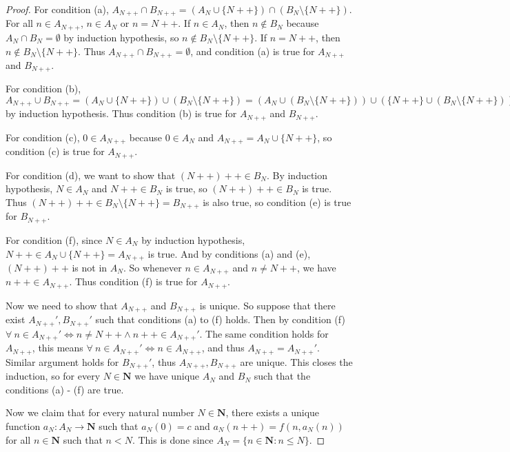 \begin{proof}
    For condition (a), \(A_{N++} \cap B_{N++} = (A_N \cup \{N++\}) \cap (B_N \setminus \{N++\})\).
    For all \(n \in A_{N++}\), \(n \in A_N\) or \(n = N++\).
    If \(n \in A_N\), then \(n \notin B_N\) because \(A_N \cap B_N = \emptyset\) by induction hypothesis, so \(n \notin B_N \setminus \{N++\}\).
    If \(n = N++\), then \(n \notin B_N \setminus \{N++\}\).
    Thus \(A_{N++} \cap B_{N++} = \emptyset\), and condition (a) is true for \(A_{N++}\) and \(B_{N++}\).

    For condition (b), \(A_{N++} \cup B_{N++} = (A_N \cup \{N++\}) \cup (B_N \setminus \{N++\}) = (A_N \cup (B_N \setminus \{N++\})) \cup (\{N++\} \cup (B_N \setminus \{N++\})) = (A_N \cup (B_N \setminus \{N++\})) \cup B_N = A_N \cup B_N = \mathbf{N}\) by induction hypothesis.
    Thus condition (b) is true for \(A_{N++}\) and \(B_{N++}\).

    For condition (c), \(0 \in A_{N++}\) because \(0 \in A_N\) and \(A_{N++} = A_N \cup \{N++\}\), so condition (c) is true for \(A_{N++}\).

    For condition (d), we want to show that \((N++)++ \in B_N\).
    By induction hypothesis, \(N \in A_N\) and \(N++ \in B_N\) is true, so \((N++)++ \in B_N\) is true.
    Thus \((N++)++ \in B_N \setminus \{N++\} = B_{N++}\) is also true, so condition (e) is true for \(B_{N++}\).

    For condition (f), since \(N \in A_N\) by induction hypothesis, \(N++ \in A_N \cup \{N++\} = A_{N++}\) is true.
    And by conditions (a) and (e), \((N++)++\) is not in \(A_N\).
    So whenever \(n \in A_{N++}\) and \(n \neq N++\), we have \(n++ \in A_{N++}\).
    Thus condition (f) is true for \(A_{N++}\).

    Now we need to show that \(A_{N++}\) and \(B_{N++}\) is unique.
    So suppose that there exist \(A_{N++}', B_{N++}'\) such that conditions (a) to (f) holds.
    Then by condition (f) \(\forall\ n \in A_{N++}' \iff n \neq N++ \land n++ \in A_{N++}'\).
    The same condition holds for \(A_{N++}\), this means \(\forall\ n \in A_{N++}' \iff n \in A_{N++}\), and thus \(A_{N++} = A_{N++}'\).
    Similar argument holds for \(B_{N++}'\), thus \(A_{N++}, B_{N++}\) are unique.
    This closes the induction, so for every \(N \in \mathbf{N}\) we have unique \(A_N\) and \(B_N\) such that the conditions (a) - (f) are true.

    Now we claim that for every natural number \(N \in \mathbf{N}\), there exists a unique function \(a_N : A_N \to \mathbf{N}\) such that \(a_N(0) = c\) and \(a_N(n++) = f(n, a_{N}(n))\) for all \(n \in \mathbf{N}\) such that \(n < N\).
    This is done since \(A_N = \{n \in \mathbf{N} : n \leq N\}\).
\end{proof}

